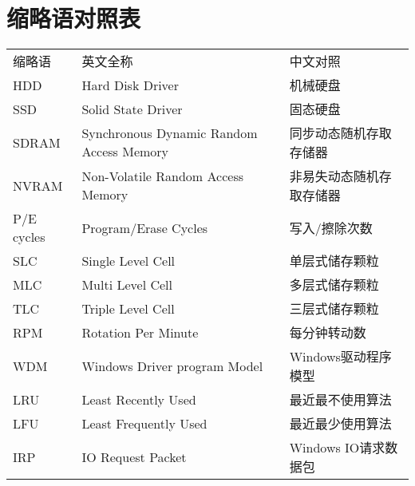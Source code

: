 
\chapter*{缩略语对照表}

\begin{tabular}{lll}
缩略语 & 英文全称 & 中文对照\\
HDD        & Hard Disk Driver & 机械硬盘\\
SSD        & Solid State Driver & 固态硬盘\\
SDRAM      & Synchronous Dynamic Random Access Memory & 同步动态随机存取存储器\\
NVRAM      & Non-Volatile Random Access Memory & 非易失动态随机存取存储器\\
P/E cycles & Program/Erase Cycles & 写入/擦除次数\\
SLC        & Single Level Cell & 单层式储存颗粒\\
MLC        & Multi Level Cell & 多层式储存颗粒\\
TLC        & Triple Level Cell & 三层式储存颗粒\\
RPM        & Rotation Per Minute & 每分钟转动数\\
WDM        & Windows Driver program Model & Windows驱动程序模型\\
LRU        & Least Recently Used & 最近最不使用算法\\
LFU        & Least Frequently Used & 最近最少使用算法\\
IRP        & IO Request Packet & Windows IO请求数据包\\
\end{tabular}
